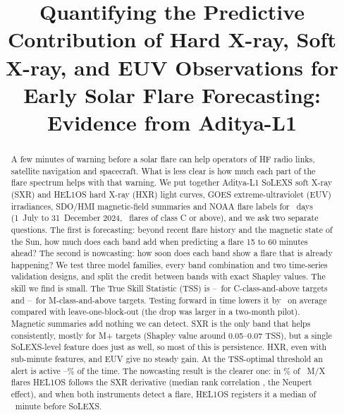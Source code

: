 \documentclass[conference]{IEEEtran}
\makeatletter
\newcommand{\absval}[1]{\expandafter\@gobble#1}
\makeatother
\begin{document}
\title{Quantifying the Predictive Contribution of Hard X-ray, Soft X-ray, and EUV Observations for Early Solar Flare Forecasting: Evidence from Aditya-L1}

\author{
}

\maketitle

\begin{abstract}
A few minutes of warning before a solar flare can help operators of HF radio links, satellite navigation and spacecraft. What is less clear is how much each part of the flare spectrum helps with that warning. We put together Aditya-L1 SoLEXS soft X-ray (SXR) and HEL1OS hard X-ray (HXR) light curves, GOES extreme-ultraviolet (EUV) irradiances, SDO/HMI magnetic-field summaries and NOAA flare labels for \NumDays\ days (1~July to 31~December 2024, \NumFlaresAll\ flares of class C or above), and we ask two separate questions. The first is forecasting: beyond recent flare history and the magnetic state of the Sun, how much does each band add when predicting a flare 15 to 60 minutes ahead? The second is nowcasting: how soon does each band show a flare that is already happening? We test three model families, every band combination and two time-series validation designs, and split the credit between bands with exact Shapley values. The skill we find is small. The True Skill Statistic (TSS) is \RangeLoC--\RangeHiC\ for C-class-and-above targets and \RangeLoM--\RangeHiM\ for M-class-and-above targets. Testing forward in time lowers it by \FwdDiffMean\ on average compared with leave-one-block-out (the drop was larger in a two-month pilot). Magnetic summaries add nothing we can detect. SXR is the only band that helps consistently, mostly for M+ targets (Shapley value around 0.05--0.07 TSS), but a single SoLEXS-level feature does just as well, so most of this is persistence. HXR, even with sub-minute features, and EUV give no steady gain. At the TSS-optimal threshold an alert is active \DutyLo--\DutyHi\% of the time. The nowcasting result is the clearer one: in \NeuPos\% of \NeuN\ M/X flares HEL1OS follows the SXR derivative (median rank correlation \NeuMedian, the Neupert effect), and when both instruments detect a flare, HEL1OS registers it a median of \absval{\PairMedMX}~minute before SoLEXS.
\end{abstract}
\end{document}
